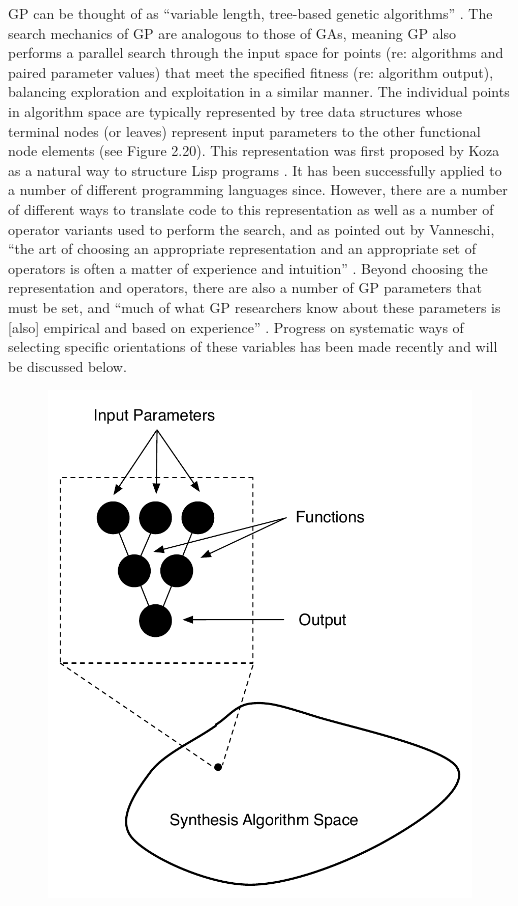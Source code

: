 \documentclass[a4paper,12pt]{report} 	%
\numberwithin{figure}{chapter}
\numberwithin{table}{chapter}
\numberwithin{equation}{chapter}
\begin{document}
\begin{flushleft}
GP can be thought of as ``variable length, tree-based genetic algorithms'' \cite[p. 29]{Teller:1998ly}. The search mechanics of GP are analogous to those of GAs, meaning GP also performs a parallel search through the input space for points (re: algorithms and paired parameter values) that meet the specified fitness (re: algorithm output), balancing exploration and exploitation in a similar manner. The individual points in algorithm space are typically represented by tree data structures whose terminal nodes (or leaves) represent input parameters to the other functional node elements (see Figure 2.20). This representation was first proposed by Koza as a natural way to structure Lisp programs \cite{Koza:1992g}. It has been successfully applied to a number of different programming languages since. However, there are a number of different ways to translate code to this representation as well as a number of operator variants  used to perform the search, and as pointed out by Vanneschi, ``the art of choosing an appropriate representation and an appropriate set of operators is often a matter of experience and intuition'' \cite[p. 6]{Vanneschi:2004le}. Beyond choosing the representation and operators, there are also a number of GP parameters that must be set, and ``much of what GP researchers know about these parameters is [also] empirical and based on experience'' \cite[p. 32]{Vanneschi:2004le}. Progress on systematic ways of selecting specific orientations of these variables has been made recently and will be discussed below.
\\
\begin{figure}[h!]
\begin{center}
\includegraphics[scale=0.70]{GraphAsPoint}

\end{center}
\end{figure}
\end{flushleft}
\end{document}
